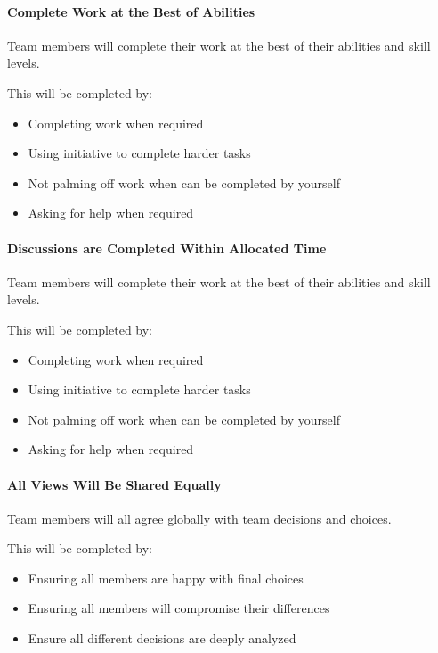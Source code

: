 \documentclass[12pt, a4paper, onecolumn]{article}
\begin{document}
\paragraph{Complete Work at the Best of Abilities}
Team members will complete their work at the best of their abilities
and skill levels.

This will be completed by:
\begin{itemize}
  \setlength\itemsep{1px}
  \item Completing work when required
  \item Using initiative to complete harder tasks
  \item Not palming off work when can be completed by yourself
  \item Asking for help when required
\end{itemize}

\paragraph{Discussions are Completed Within Allocated Time}
Team members will complete their work at the best of their abilities
and skill levels.

This will be completed by:
\begin{itemize}
  \setlength\itemsep{1px}
  \item Completing work when required
  \item Using initiative to complete harder tasks
  \item Not palming off work when can be completed by yourself
  \item Asking for help when required
\end{itemize}

\paragraph{All Views Will Be Shared Equally}
Team members will all agree globally with team decisions and choices.

This will be completed by:
\begin{itemize}
  \setlength\itemsep{1px}
  \item Ensuring all members are happy with final choices
  \item Ensuring all members will compromise their differences
  \item Ensure all different decisions are deeply analyzed
\end{itemize}
\end{document}
